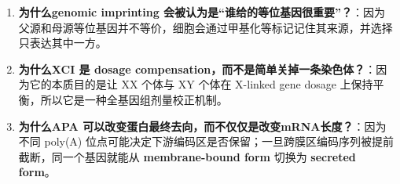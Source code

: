 \documentclass[12pt,fontset=none]{ctexart}
\begin{document}
\begin{enumerate}
\item \textbf{为什么genomic imprinting 会被认为是“谁给的等位基因很重要”？}：因为父源和母源等位基因并不等价，细胞会通过甲基化等标记记住其来源，并选择只表达其中一方。

\item \textbf{为什么XCI 是 dosage compensation，而不是简单关掉一条染色体？}：因为它的本质目的是让 XX 个体与 XY 个体在 X-linked gene dosage 上保持平衡，所以它是一种全基因组剂量校正机制。

\item \textbf{为什么APA 可以改变蛋白最终去向，而不仅仅是改变mRNA长度？}：因为不同 poly(A) 位点可能决定下游编码区是否保留；一旦跨膜区编码序列被提前截断，同一个基因就能从 \textbf{membrane-bound form} 切换为 \textbf{secreted form}。

\end{enumerate}
\end{document}
